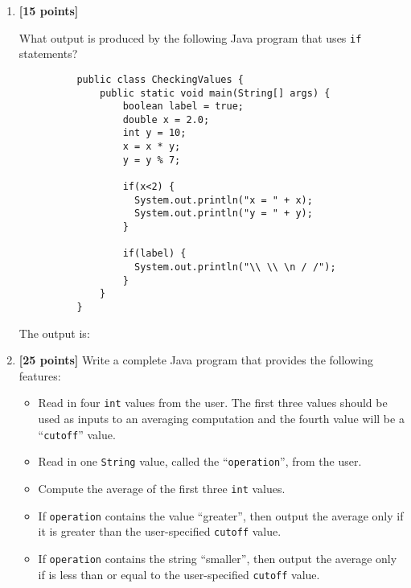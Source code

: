 \begin{enumerate}
\begin{verbatim}
(done || !done)
\end{verbatim}	

\vspace*{-.175in}
The value is: \mbox{\underline{\hspace{3in}}}

\item {\bf [15 points]}

  What output is produced by the following Java program that uses {\tt if} statements? 
\begin{verbatim}
          public class CheckingValues {
              public static void main(String[] args) {
                  boolean label = true;
                  double x = 2.0;
                  int y = 10;
                  x = x * y;
                  y = y % 7;

                  if(x<2) {
                    System.out.println("x = " + x);
                    System.out.println("y = " + y);
                  }

                  if(label) {
                    System.out.println("\\ \\ \n / /");
                  }
              }
          }
\end{verbatim}
\vspace*{-.05in}
The output is:
\vspace{1in}

\item {\bf [25 points]}
Write a complete Java program that provides the following features:
\begin{itemize}

  \item Read in four {\tt int} values from the user.  The first three values should be used as inputs to an averaging
    computation and the fourth value will be a ``{\tt cutoff}'' value.

  \item Read in one {\tt String} value, called the ``{\tt operation}'', from the user.

  \item Compute the average of the first three {\tt int} values.

  \item If {\tt operation} contains the value ``greater'', then output the average only if it is greater than the
    user-specified {\tt cutoff} value.

  \item If {\tt operation} contains the string ``smaller'', then output the average only if is less than or equal to the
    user-specified {\tt cutoff} value.


\end{itemize}
\end{enumerate}
